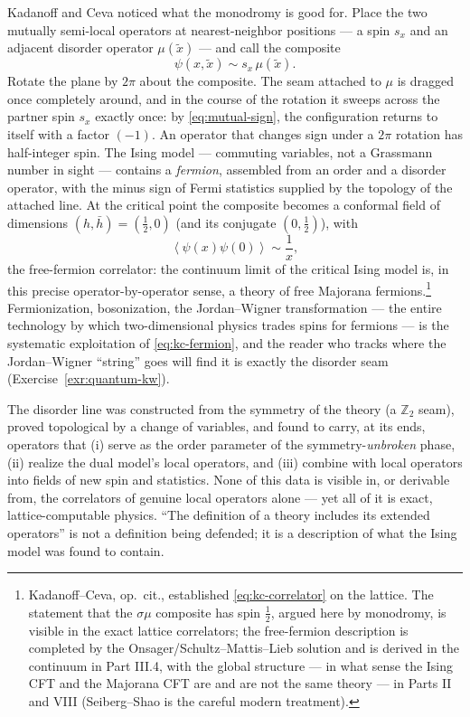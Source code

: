 Kadanoff and Ceva noticed what the monodromy is good for. Place the two
mutually semi-local operators at nearest-neighbor positions --- a spin
$s_x$ and an adjacent disorder operator $\mu(\tilde x)$ --- and call the
composite
\begin{equation}
\psi(x, \tilde x) \sim s_x\, \mu(\tilde x).
\label{eq:kc-fermion}
\end{equation}
Rotate the plane by $2\pi$ about the composite. The seam attached to
$\mu$ is dragged once completely around, and in the course of the
rotation it sweeps across the partner spin $s_x$ exactly once: by
\eqref{eq:mutual-sign}, the configuration returns to itself with a
factor $(-1)$. An operator that changes sign under a $2\pi$ rotation has
half-integer spin. The Ising model --- commuting variables, not a
Grassmann number in sight --- contains a \emph{fermion}, assembled from
an order and a disorder operator, with the minus sign of Fermi
statistics supplied by the topology of the attached line. At the
critical point the composite becomes a conformal field of dimensions
$(h, \bar h) = (\frac12, 0)$ (and its conjugate $(0, \frac12)$), with
\begin{equation}
\left\langle \psi(x) \psi(0) \right\rangle \sim \frac{1}{x},
\label{eq:kc-correlator}
\end{equation}
the free-fermion correlator: the continuum limit of the critical Ising
model is, in this precise operator-by-operator sense, a theory of free
Majorana fermions.\footnote{Kadanoff--Ceva, op.\ cit., established
\eqref{eq:kc-correlator} on the lattice. The statement that the
$\sigma\mu$ composite has spin $\frac12$, argued here by monodromy, is
visible in the exact lattice correlators; the free-fermion description
is completed by the Onsager/Schultz--Mattis--Lieb solution and is
derived in the continuum in Part III.4, with the global structure ---
in what sense the Ising CFT and the Majorana CFT are and are not the
same theory --- in Parts II and VIII (Seiberg--Shao 
is the careful modern treatment).} Fermionization, bosonization, the
Jordan--Wigner transformation --- the entire technology by which
two-dimensional physics trades spins for fermions --- is the systematic
exploitation of \eqref{eq:kc-fermion}, and the reader who tracks where
the Jordan--Wigner ``string'' goes will find it is exactly the disorder
seam (Exercise~\ref{exr:quantum-kw}).

\begin{iidea}
\label{idea:mu-payoff}
The disorder line was constructed from the symmetry of the theory (a
$\mathbb{Z}_2$ seam), proved topological by a change of variables, and found to
carry, at its ends, operators that (i) serve as the order parameter of
the symmetry-\emph{unbroken} phase, (ii) realize the dual model's local
operators, and (iii) combine with local operators into fields of new
spin and statistics. None of this data is visible in, or derivable
from, the correlators of genuine local operators alone --- yet all of
it is exact, lattice-computable physics. ``The definition of a theory
includes its extended operators'' is not a definition being defended;
it is a description of what the Ising model was found to contain.
\end{iidea}

